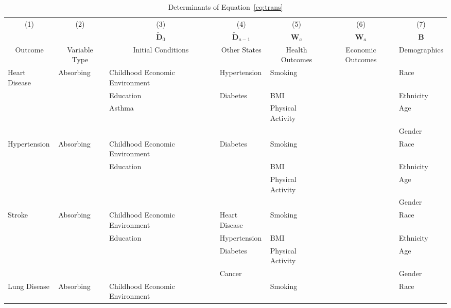\begin{table}
\caption{Determinants of Equation~\eqref{eq:trans}} \label{table:supertab1}
\begin{scriptsize}
\begin{tabular}{lllllll}
\toprule 
\multicolumn{1}{c}{(1)} & \multicolumn{1}{c}{(2)} & \multicolumn{1}{c}{(3)} & \multicolumn{1}{c}{(4)} & \multicolumn{1}{c}{(5)} & \multicolumn{1}{c}{(6)} & \multicolumn{1}{c}{(7)} \\
 & &  \multicolumn{1}{c}{$\tilde{\bm{D}}_0$} &  \multicolumn{1}{c}{$\tilde{\bm{D}}_{a-1}$} & \multicolumn{1}{c}{ $\bm{W}_a$ } &  \multicolumn{1}{c}{ $\bm{W}_a$ } &  \multicolumn{1}{c}{$\bm{B}$} \\ 
\multicolumn{1}{c}{Outcome} & \multicolumn{1}{c}{Variable Type} & \multicolumn{1}{c}{Initial Conditions} & \multicolumn{1}{c}{Other States} & \multicolumn{1}{c}{Health Outcomes} & \multicolumn{1}{c}{Economic Outcomes} & \multicolumn{1}{c}{Demographics} \\
\midrule
Heart Disease   & Absorbing & Childhood Economic Environment & Hypertension    & Smoking   &                                & Race \\
			    &           & Education & Diabetes & BMI &  & Ethnicity \\
			    &           & Asthma & & Physical Activity &  & Age \\
			    &           &        &  &  &  & Gender \\
\midrule			
Hypertension & Absorbing & Childhood Economic Environment & Diabetes    & Smoking   &                                & Race \\
&           & Education &  & BMI &  & Ethnicity \\
&           &  & & Physical Activity &  & Age \\
&           &        &  &  &  & Gender \\
\midrule			
Stroke & Absorbing & Childhood Economic Environment & Heart Disease    & Smoking   &                                & Race \\
&           & Education & Hypertension & BMI &  & Ethnicity \\
&           &  & Diabetes & Physical Activity &  & Age \\
&           &        & Cancer &  &  & Gender \\
\midrule		
Lung Disease & Absorbing & Childhood Economic Environment &   & Smoking   &                                & Race \\

\end{tabular}
\end{scriptsize}
\end{table}

